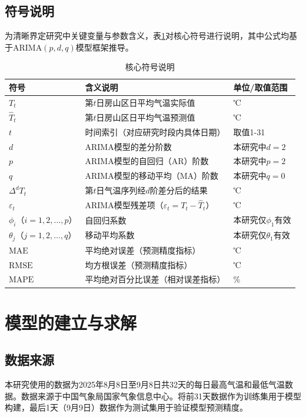\documentclass[withoutpreface,bwprint]{cumcmthesis} %
\begin{document}
\subsection{符号说明}
\label{subsec:symbol_definition}

为清晰界定研究中关键变量与参数含义，表\ref{tab:symbol_def}对核心符号进行说明，其中公式均基于$\text{ARIMA}(p,d,q)$模型框架推导。

\begin{table}[htbp]
  \centering
  \caption{核心符号说明}
  \label{tab:symbol_def}
  \begin{tabular}{l l l}
    \toprule 
    符号 & 含义说明 & 单位/取值范围 \\
    \midrule
    $T_t$ & 第$t$日房山区日平均气温实际值 & ℃ \\
    $\hat{T}_t$ & 第$t$日房山区日平均气温预测值 & ℃ \\
    $t$ & 时间索引（对应研究时段内具体日期） & 取值1-31 \\
    $d$ & ARIMA模型的差分阶数 & 本研究中$d=2$ \\
    $p$ & ARIMA模型的自回归（AR）阶数 & 本研究中$p=2$ \\
    $q$ & ARIMA模型的移动平均（MA）阶数 & 本研究中$q=0$ \\
    $\Delta^d T_t$ & 第$t$日气温序列经$d$阶差分后的结果 & ℃ \\
    $\varepsilon_t$ & ARIMA模型残差项（$\varepsilon_t = T_t - \hat{T}_t$） & ℃\\
    $\phi_i$（$i=1,2,\dots,p$） & 自回归系数 & 本研究仅$\phi_1$有效 \\
    $\theta_j$（$j=1,2,\dots,q$） & 移动平均系数 & 本研究仅$\theta_1$有效 \\
    $\text{MAE}$ & 平均绝对误差（预测精度指标） & ℃ \\
    $\text{RMSE}$ & 均方根误差（预测精度指标） & ℃\\
    $\text{MAPE}$ & 平均绝对百分比误差（相对误差指标） & \%\\
    \bottomrule
  \end{tabular}
\end{table}
\section{模型的建立与求解}
\subsection{数据来源}
本研究使用的数据为2025年8月8日至9月8日共32天的每日最高气温和最低气温数据。数据来源于中国气象局国家气象信息中心。将前31天数据作为训练集用于模型构建，最后1天（9月9日）数据作为测试集用于验证模型预测精度。
\end{document}
